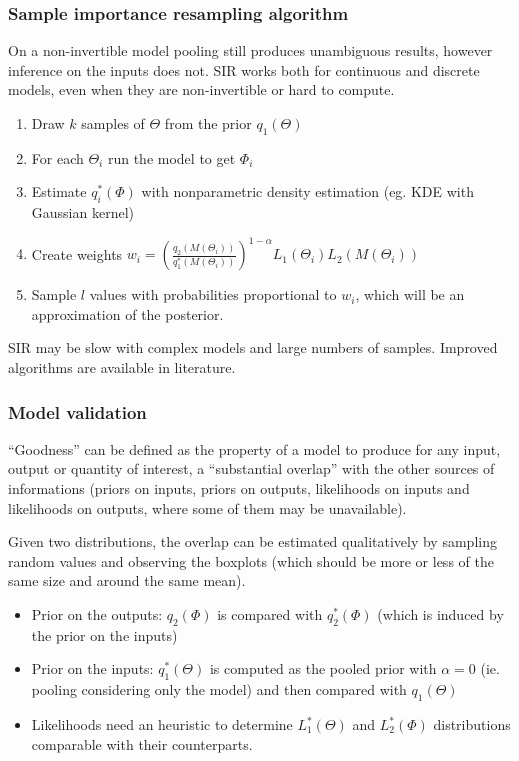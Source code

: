\documentclass[aspectratio=43]{beamer}
\begin{document}
\begin{frame}
	\frametitle{Sample importance resampling algorithm}
	On a non-invertible model pooling still produces unambiguous results, however inference on the inputs does not. SIR works both for continuous and discrete models, even when they are non-invertible or hard to compute.
	
	\begin{enumerate}
		\item Draw $k$ samples of $\Theta$ from the prior $q_1(\Theta)$
		\item For each $\Theta_i$ run the model to get $\Phi_i$
		\item Estimate $q_i^*(\Phi)$ with nonparametric density estimation (eg. KDE with Gaussian kernel)
		\item Create weights $w_i = (\frac{q_2(M(\Theta_i))}{q_1^*(M(\Theta_i))})^{1-\alpha} L_1(\Theta_i) L_2(M(\Theta_i))$
		\item Sample $l$ values with probabilities proportional to $w_i$, which will be an approximation of the posterior.
	\end{enumerate}

	SIR may be slow with complex models and large numbers of samples. Improved algorithms are available in literature.
	
\end{frame}

\begin{frame}
	\frametitle{Model validation}
	``Goodness'' can be defined as the property of a model to produce for any input, output or quantity of interest, a ``substantial overlap'' with the other sources of informations (priors on inputs, priors on outputs, likelihoods on inputs and likelihoods on outputs, where some of them may be unavailable).
	
	Given two distributions, the overlap can be estimated qualitatively by sampling random values and observing the boxplots (which should be more or less of the same size and around the same mean).
	
	\begin{itemize}
		\item Prior on the outputs: $q_2(\Phi)$ is compared with $q_2^*(\Phi)$ (which is induced by the prior on the inputs)
		\item Prior on the inputs: $q_1^*(\Theta)$ is computed as the pooled prior with $\alpha = 0$ (ie. pooling considering only the model) and then compared with $q_1(\Theta)$
		\item Likelihoods need an heuristic to determine $L_1^*(\Theta)$ and $L_2^*(\Phi)$ distributions comparable with their counterparts.
	\end{itemize}
	
\end{frame}
\end{document}
